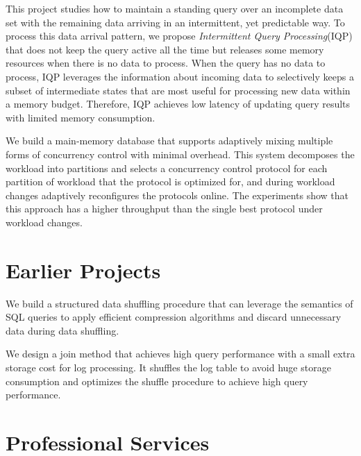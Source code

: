 \documentclass[10pt]{article} %
\newcommand{\iqp}{IQP\xspace}
\begin{document}
{This project studies how to maintain a standing query 
over an incomplete data set with the remaining data
arriving in an intermittent, yet predictable way. 
To process this data arrival pattern, 
we propose \textit{Intermittent Query Processing}(\iqp) 
that does not keep the query active all the time but releases some memory resources when there is no data to process. 
When the query has no data to process, 
\iqp leverages the information about incoming data to 
selectively keeps a subset of intermediate states that are most useful 
for processing new data within a memory budget. 
Therefore, \iqp achieves low latency of updating query results with limited memory consumption.}

{We build a main-memory database that supports adaptively mixing multiple forms of concurrency control with minimal overhead. 
This system decomposes the workload into partitions and 
selects a concurrency control protocol for each partition of workload that the protocol is optimized for, 
and during workload changes adaptively reconfigures the protocols online. 
The experiments show that this approach has a higher throughput than the single best protocol under workload changes.}

\section{Earlier Projects}
{We build a structured data shuffling procedure that can leverage the semantics of SQL queries to apply efficient compression algorithms 
and discard unnecessary data during data shuffling.}

{We design a join method that achieves high query performance with a small extra storage cost for log processing. 
It shuffles the log table to avoid huge storage consumption and optimizes the shuffle procedure to achieve high query performance.}

\vspace{-5mm}

\section{Professional Services}
\vspace{-5mm}
\end{document}
